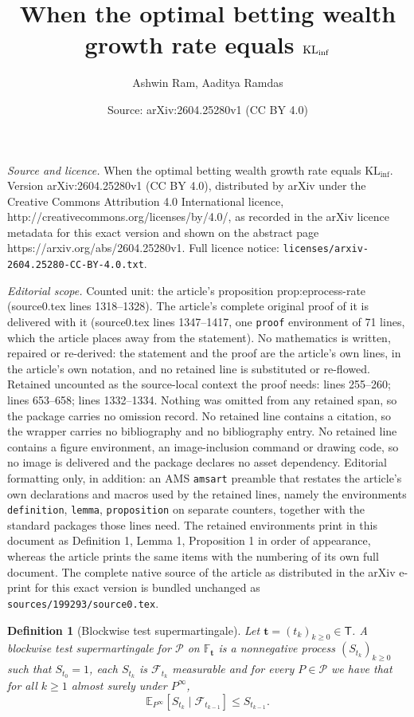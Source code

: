 \documentclass[10pt,a4paper]{amsart}
\title{When the optimal betting wealth growth rate equals $\KLinf$}
\author{Ashwin Ram, Aaditya Ramdas}
\date{Source: arXiv:2604.25280v1 (CC BY 4.0)}
\newtheorem{definition}{Definition}
\newcommand{\E}{\mathbb{E}}
\newcommand{\KLinf}{\mathrm{KL}_{\mathrm{inf}}}
\newcommand{\Pcal}{\mathcal{P}}
\newcommand{\Tdet}{\mathsf T}
\newcommand{\bbF}{\mathbb F}
\newcommand{\bt}{\mathbf t}
\begin{document}
\maketitle

\noindent\emph{Source and licence.} When the optimal betting wealth growth rate equals $\KLinf$. Version arXiv:2604.25280v1 (CC BY 4.0), distributed by arXiv under the Creative Commons Attribution 4.0 International licence, http://creativecommons.org/licenses/by/4.0/, as recorded in the arXiv licence metadata for this exact version and shown on the abstract page https://arxiv.org/abs/2604.25280v1. Full licence notice: \texttt{licenses/arxiv-2604.25280-CC-BY-4.0.txt}.\par\smallskip

\noindent\textit{Editorial scope.} Counted unit: the article's proposition prop:eprocess-rate (source0.tex lines 1318--1328). The article's complete original proof of it is delivered with it (source0.tex lines 1347--1417, one \texttt{proof} environment of 71 lines, which the article places away from the statement). No mathematics is written, repaired or re-derived: the statement and the proof are the article's own lines, in the article's own notation, and no retained line is substituted or re-flowed.  Retained uncounted as the source-local context the proof needs: lines 255--260; lines 653--658; lines 1332--1334.  Nothing was omitted from any retained span, so the package carries no omission record.  No retained line contains a citation, so the wrapper carries no bibliography and no bibliography entry.  No retained line contains a figure environment, an image-inclusion command or drawing code, so no image is delivered and the package declares no asset dependency.  Editorial formatting only, in addition: an AMS \texttt{amsart} preamble that restates the article's own declarations and macros used by the retained lines, namely the environments \texttt{definition}, \texttt{lemma}, \texttt{proposition} on separate counters, together with the standard packages those lines need.  The retained environments print in this document as Definition 1, Lemma 1, Proposition 1 in order of appearance, whereas the article prints the same items with the numbering of its own full document.  The complete native source of the article as distributed in the arXiv e-print for this exact version is bundled unchanged as \texttt{sources/199293/source0.tex}.
\begin{definition}[Blockwise test supermartingale]\label{def:test-supermartingale}
Let $\bt=(t_k)_{k\ge 0}\in \Tdet$. A blockwise test supermartingale for $\Pcal$ on $\bbF_{\bt}$ is a nonnegative process $(S_{t_k})_{k\ge 0}$ such that $S_{t_0}=1$, each $S_{t_k}$ is $\mathcal F_{t_k}$ measurable and for every $P\in\Pcal$ we have that for all $k\ge 1$ almost surely under $P^{\infty}$,
\[
\E_{P^{\infty}}[S_{t_k}\mid \mathcal F_{t_{k-1}}]\le S_{t_{k-1}}.
\]
\end{definition}
\end{document}
